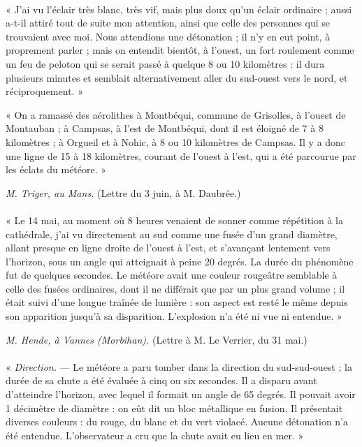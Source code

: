\documentclass[a4paper, 11pt, oneside, polutonikogreek, french]{article}
\begin{document}
\paragraph{}
« J'ai vu l'éclair très blanc, très vif, mais plus doux qu'un éclair ordinaire ; aussi a-t-il attiré tout de suite mon attention, ainsi que celle des personnes qui se trouvaient avec moi. Nous attendions une détonation ; il n'y en eut point, à proprement parler ; mais on entendit bientôt, à l'ouest, un fort roulement comme un feu de peloton qui se serait passé à quelque 8 ou 10 kilomètres : il dura plusieurs minutes et semblait alternativement aller du sud-ouest vers le nord, et réciproquement. »

« On a ramassé des aérolithes à Montbéqui, commune de Grisolles, à l'ouest de Montauban ; à Campsas, à l'est de Montbéqui, dont il est éloigné de 7 à 8 kilomètres ; à Orgueil et à Nohic, à 8 ou 10 kilomètres de Campsas. Il y a donc une ligne de 15 à 18 kilomètres, courant de l'ouest à l'est, qui a été parcourue par les éclats du météore. »
\begin{center}
\emph{M. Triger, au Mans.} (Lettre du 3 juin, à M. Daubrée.)
\end{center}
\paragraph{}
« Le 14 mai, au moment où 8 heures venaient de sonner comme répétition à la cathédrale, j'ai vu directement au sud comme une fusée d'un grand diamètre, allant presque en ligne droite de l'ouest à l'est, et s'avançant lentement vers l'horizon, sous un angle qui atteignait à peine 20 degrés. La durée du phénomène fut de quelques secondes. Le météore avait une couleur rougeâtre semblable à celle des fusées ordinaires, dont il ne différait que par un plus grand volume ; il était suivi d'une longue traînée de lumière : son aspect est resté le même depuis son apparition jusqu'à sa disparition. L'explosion n'a été ni vue ni entendue. »
\begin{center}
\emph{M. Hende, à Vannes (Morbihan).} (Lettre à M. Le Verrier, du 31 mai.)
\end{center}
\paragraph{}
« \emph{Direction.} --- Le météore a paru tomber dans la direction du sud-sud-ouest ; la durée de sa chute a été évaluée à cinq ou six secondes. Il a disparu avant d'atteindre l'horizon, avec lequel il formait un angle de 65 degrés. Il pouvait avoir 1 décimètre de diamètre : on eût dit un bloc métallique en fusion. Il présentait diverses couleurs : du rouge, du blanc et du vert violacé. Aucune détonation n'a été entendue. L'observateur a cru que la chute avait eu lieu en mer. »
\end{document}
